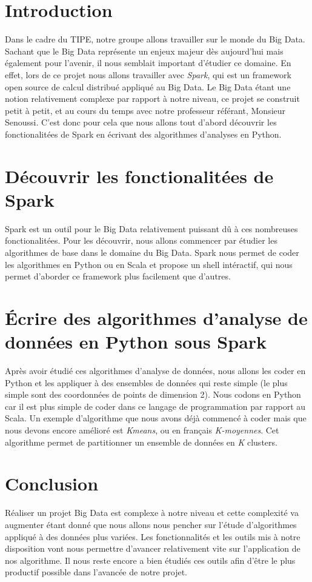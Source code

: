 \documentclass[12pt]{article}
\begin{document}
\tableofcontents
{}
\pagebreak


\section*{Introduction}
Dans le cadre du TIPE, notre groupe allons travailler sur le monde du Big Data. Sachant que le Big Data représente un enjeux majeur dès aujourd'hui mais également pour l'avenir, il nous semblait important d'étudier ce domaine. En effet, lors de ce projet nous allons travailler avec \textit{Spark}, qui est un framework open source de calcul distribué appliqué au Big Data. Le Big Data étant une notion relativement complexe par rapport à notre niveau, ce projet se construit petit à petit, et au cours du temps avec notre professeur référant, Monsieur Senoussi. C'est donc pour cela que nous allons tout d'abord d\'ecouvrir les fonctionalit\'ees de Spark en \'ecrivant des algorithmes d'analyses en Python.
\section{D\'ecouvrir les fonctionalit\'ees de Spark}
Spark est un outil pour le Big Data relativement puissant dû à ces nombreuses fonctionalit\'ees. Pour les d\'ecouvrir, nous allons commencer par étudier les algorithmes de base dans le domaine du Big Data. Spark nous permet de coder les algorithmes en Python ou en Scala et propose un shell intéractif, qui nous permet d'aborder ce framework plus facilement que d'autres.
\section{\'Ecrire des algorithmes d'analyse de données en Python sous Spark}
Après avoir étudié ces algorithmes d'analyse de données, nous allons les coder en Python et les appliquer à des ensembles de données qui reste simple (le plus simple sont des coordonnées de points de dimension 2). Nous codons en Python car il est plus simple de coder dans ce langage de programmation par rapport au Scala. Un exemple d'algorithme que nous avons déjà commencé à coder mais que nous devons encore amélioré est \textit{Kmeans}, ou en français \textit{K-moyennes}. Cet algorithme permet de partitionner un ensemble de données en \textit{K} clusters. 
\section*{Conclusion}
Réaliser un projet Big Data est complexe à notre niveau et cette complexité va augmenter étant donné que nous allons nous pencher sur l'étude d'algorithmes appliqué à des données plus variées. Les fonctionnalités et les outils mis à notre disposition vont nous permettre d'avancer relativement vite sur l'application de nos algorithme. Il nous reste encore a bien étudiés ces outils afin d'être le plus productif possible dans l'avancée de notre projet. 
\end{document}

